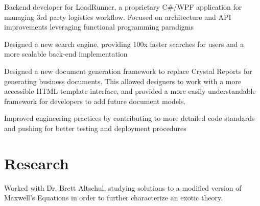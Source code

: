 \documentclass[no-math]{deedy-resume-openfont}
\begin{document}
\begin{minipage}[t]{0.66\textwidth}
		
		\vspace{\topsep} %
		\begin{tightemize}
			\item Backend developer for LoadRunner, a proprietary C\#/WPF application for managing 3rd party logistics workflow. Focused on architecture and API improvements leveraging functional programming paradigms
			\item Designed a new search engine, providing 100x faster searches for users and a more scalable back-end implementation
			\item Designed a new document generation framework to replace Crystal Reports for generating business documents. This allowed designers to work with a more accessible HTML template interface, and provided a more easily understandable framework for developers to add future document models.
			\item Improved engineering practices by contributing to more detailed code standards and pushing for better testing and deployment procedures
		\end{tightemize}
		\sectionsep
		


\section{Research}
Worked with Dr. Brett Altschul, studying solutions to a modified version of Maxwell's Equations in order to further characterize an exotic theory. 
\sectionsep


\end{minipage}
\end{document}
